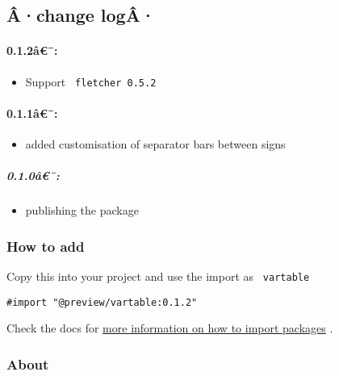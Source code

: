 
\subsection{Â·change logÂ·}\label{uxe2change-loguxe2}

\paragraph{0.1.2â€¯:}\label{uxe2}

\begin{itemize}
\tightlist
\item
  Support \texttt{\ fletcher\ 0.5.2\ }
\end{itemize}

\paragraph{0.1.1â€¯:}\label{uxe2-1}

\begin{itemize}
\tightlist
\item
  added customisation of separator bars between signs
\end{itemize}

\subparagraph{0.1.0â€¯:}\label{uxe2-2}

\begin{itemize}
\tightlist
\item
  publishing the package
\end{itemize}

\subsubsection{How to add}\label{how-to-add}

Copy this into your project and use the import as \texttt{\ vartable\ }

\begin{verbatim}
#import "@preview/vartable:0.1.2"
\end{verbatim}



Check the docs for
\href{https://typst.app/docs/reference/scripting/\#packages}{more
information on how to import packages} .

\subsubsection{About}\label{about}

